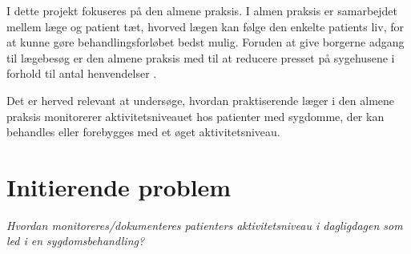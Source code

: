 I dette projekt fokuseres på den almene praksis. I almen praksis er samarbejdet mellem læge og patient tæt, hvorved lægen kan følge den enkelte patients liv, for at kunne gøre behandlingsforløbet bedst mulig. Foruden at give borgerne adgang til lægebesøg er den almene praksis med til at reducere presset på sygehusene i forhold til antal henvendelser \citep{vedsted2014}.

Det er herved relevant at undersøge, hvordan praktiserende læger i den almene praksis monitorerer aktivitetsniveauet hos patienter med sygdomme, der kan behandles eller forebygges med et øget aktivitetsniveau.  


\section{Initierende problem}
\textit{Hvordan monitoreres/dokumenteres patienters aktivitetsniveau i dagligdagen som led i en sygdomsbehandling?}  

